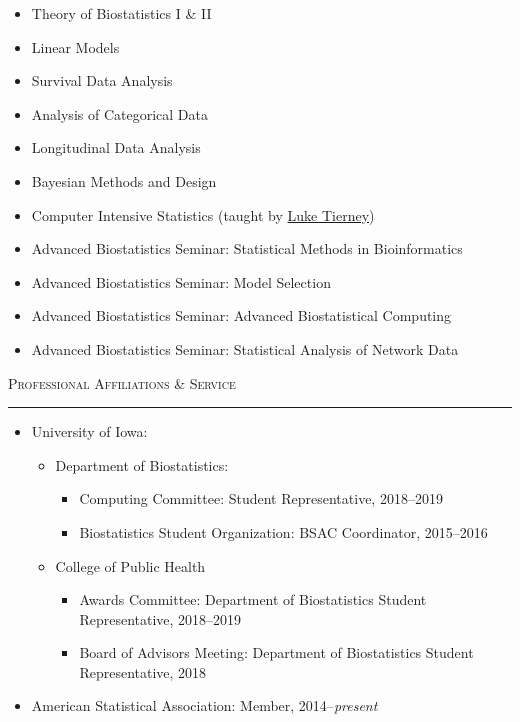\documentclass[a4paper]{article}
\begin{document}
\begin{itemize}
  \item Theory of Biostatistics I \& II
  \item Linear Models
  \item Survival Data Analysis
  \item Analysis of Categorical Data
  \item Longitudinal Data Analysis
  \item Bayesian Methods and Design
  \item Computer Intensive Statistics (taught by \href{https://github.com/brandondbutcher}{Luke Tierney})
  \item Advanced Biostatistics Seminar: Statistical Methods in Bioinformatics
  \item Advanced Biostatistics Seminar: Model Selection
  \item Advanced Biostatistics Seminar: Advanced Biostatistical Computing
  \item Advanced Biostatistics Seminar: Statistical Analysis of Network Data
\end{itemize}


\begin{flushleft}
  \Large\textsc{Professional Affiliations \& Service}
  \textcolor{usafagrey}{\rule[0.5\baselineskip]{\textwidth}{0.75pt}}
\end{flushleft}
\vspace{-1.5\baselineskip}

\begin{itemize}
  \item University of Iowa:
  \begin{itemize}
    \item Department of Biostatistics:
    \begin{itemize}
      \item Computing Committee: Student Representative, 2018--2019
      \item Biostatistics Student Organization: BSAC Coordinator, 2015--2016
    \end{itemize}
    \item College of Public Health
    \begin{itemize}
      \item Awards Committee: Department of Biostatistics Student Representative, 2018--2019
      \item Board of Advisors Meeting: Department of Biostatistics Student Representative, 2018
    \end{itemize}
  \end{itemize}
  \item American Statistical Association: Member, 2014--\textit{present}
\end{itemize}
\end{document}
